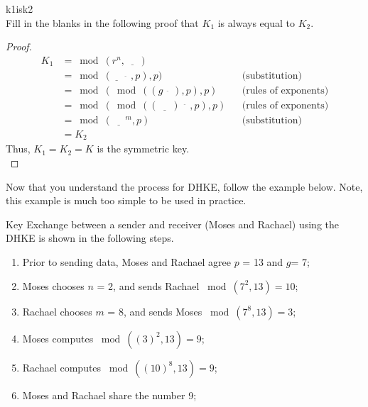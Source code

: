 \begin{exercise}{k1isk2}\\
Fill in the blanks in the following proof that  $K_1$ is always equal to  $K_2$.\\
  	\begin{proof} 
		\begin{align*} 
		K_1 &=   \bmod (r^n , \underline{~~~~~~}) 
           	\\&=  \bmod ( \underline{~~~~}^{\underline{~~~~~~}} , p) , p )&& \text{(substitution)}	%
		\\&= \bmod ( \bmod ((g^{\underline{~~~~~~}}) , p) , p )&&  \text{(rules of exponents)}	%
           	\\&= \bmod ( \bmod ((\underline{~~~~~~})^{\underline{~~~~~~}} , p) , p )  &&\text{(rules of exponents)}	%
           	\\&= \bmod (\underline{~~~~~~}^m , p )&&\text{(substitution)}   	%
		\\&= K_2
		\end{align*} 
   	Thus, $K_1 = K_2 = K$ is the symmetric key.\\

  	\end{proof}
\end{exercise}

Now that you understand the process for DHKE, follow the example below.  Note, this example is much too simple to be used in practice.

 \begin{eg} Key Exchange between a sender and receiver (Moses and Rachael) using the DHKE is shown in the following steps.
\begin{enumerate}[Step 1.]
\item Prior to sending data, Moses and Rachael agree $p$ = 13 and $g$= 7; 
\item Moses chooses $n$ = 2, and sends Rachael $\bmod (7^2 , 13) = 10$;
\item Rachael chooses $m$ = 8, and sends Moses $\bmod (7^8  , 13) = 3 $;
\item Moses computes $\bmod ((3)^2 , 13 ) = 9$;
\item Rachael computes $\bmod ((10)^8 , 13 ) = 9$;
\item Moses and Rachael share the number 9;
\end{enumerate}
\end{eg}

